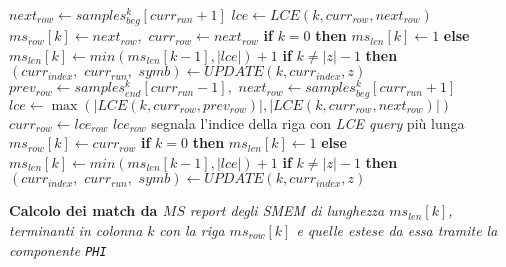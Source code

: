 \begin{algorithm}
\begin{algorithmic}[1]
    \State $next_{row}\gets samples_{beg}^k[curr_{run}+1]$ 
    \State $lce\gets LCE(k, curr_{row}, next_{row})$
    \State $ms_{row}[k]\gets next_{row},\,\,curr_{row}\gets next_{row}$
    \State \textbf{if} $k=0$ \textbf{then} $ms_{len}[k] \gets 1$ \textbf{else}
    $ms_{len}[k] \gets min(ms_{len}[k-1], |lce|)+1$
    \State \textbf{if} $k\neq |z|-1$ \textbf{then} $(curr_{index},\,\,
    curr_{run},\,\,symb)\gets UPDATE(k, curr_{index},z)$  
    \Else
    \State $prev_{row}\gets samples_{end}^k[curr_{run}-1],\,\,next_{row}\gets
    samples_{beg}^k[curr_{run}+1]$ 
    \State $lce\gets \max (|LCE(k, curr_{row}, prev_{row})|, |LCE(k,
    curr_{row}, next_{row})|)$
    \State $curr_{row}\gets lce_{row}$
    \Comment $lce_{row}$ segnala l'indice della riga con \textit{LCE query} più
    lunga 
    \State $ms_{row}[k]\gets curr_{row}$
    \State \textbf{if} $k=0$ \textbf{then} $ms_{len}[k] \gets 1$ \textbf{else}
    $ms_{len}[k] \gets min(ms_{len}[k-1], |lce|)+1$
    \State \textbf{if} $k\neq |z|-1$ \textbf{then}
    $(curr_{index},\,\,curr_{run},\,\,symb)\gets UPDATE(k, curr_{index},z)$ 
    \EndIf
    \EndIf
    \EndIf
    \EndFor
    
    \For {\textit{every} $k\in[0,|z|)$}
    \Comment \textbf{Calcolo dei match da $MS$}
    \State \textit{report degli SMEM di lunghezza $ms_{len}[k]$, terminanti in
    colonna $k$}
    \State \textit{con la riga $ms_{row}[k]$ e quelle estese da essa tramite
    la componente \texttt{PHI}} 
    \EndIf
    \EndFor
    \EndFunction
    
  \end{algorithmic}
  \caption{\footnotesize{Calcolo degli SMEM con aplotipo esterno con componenti
  \texttt{MAP-INT/BV} (i cui usi diversificati sono segnalati con ``oppure''),
  \texttt{LCE}, \texttt{PERM} e \texttt{PHI}.}}
  \label{algo:matchlce}
\end{algorithm}

